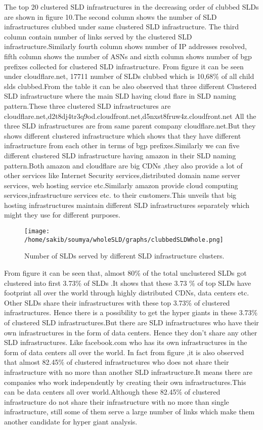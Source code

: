 The top 20 clustered SLD infrastructures in the decreasing order of clubbed SLDs are shown in figure 10.The second column shows the number of SLD infrastructures clubbed under same clustered SLD infrastructure. The third column contain number of links served by the clustered SLD infrastructure.Similarly fourth column shows number of IP addresses resolved, fifth column shows the number of ASNs  and sixth column shows number of bgp prefixes collected for clustered SLD infrastructure. From figure it can be seen under cloudflare.net, 17711 number of SLDs clubbed which is  10,68\% of all child slds clubbed.From the table it can be also observed that three different Clustered SLD infrastructure where the main SLD having cloud flare in SLD naming pattern.These three clustered SLD infrastructures are cloudflare.net,d2t8dj4tr3q9od.cloudfront.net,d5nxst8fruw4z.cloudfront.net
All the three SLD infrastructures are from same parent company cloudflare.net.But they shows different clustered infrastructure which shows that they have different infrastructure from each other in terms of bgp prefixes.Similarly we can five different clustered SLD infrastructure having amazon in their SLD naming pattern.Both amazon and cloudflare are big CDNs ,they also provide a lot of other services like  Internet Security services,distributed domain name server services, web hosting service etc.Similarly amazon provide cloud computing services,infrastructure services etc. to their customers.This unveils that big hosting infrastructures maintain different SLD infrastructures separately which might they use for different purposes. 

\begin{figure}[h]
\texttt{[image: /home/sakib/soumya/wholeSLD/graphs/clubbedSLDWhole.png]}
\centering
\caption{Number of SLDs served by different SLD infrastructure clusters.}
\end{figure}

From figure it can be seen that, almost 80\% of the total unclustered SLDs got clustered into first 3.73\% of SLDs .It shows that these 3.73 \% of top SLDs have footprint all over the world through highly distributed CDNs, data centers etc. Other SLDs share their infrastructures with these top 3.73\% of clustered infrastructures. Hence there is a possibility to get the hyper giants in these 3.73\% of clustered SLD infrastructures.But there are SLD infrastructures who have their own infrastructures in the form of data centers. Hence they don't share any other SLD infrastructures. Like facebook.com who has its own infrastructures in the form of data centers all over the world. In fact from figure ,it is also observed that almost 82.45\% of clustered infrastructures who does not share their infrastructure with no more than another SLD infrastructure.It means there are companies who work independently by creating their own infrastructures.This can be data centers all over world.Although these 82.45\% of clustered infrastructure do not share their infrastructure with no more than single infrastructure, still some of them serve a large number of links which make them another candidate for hyper giant analysis.

